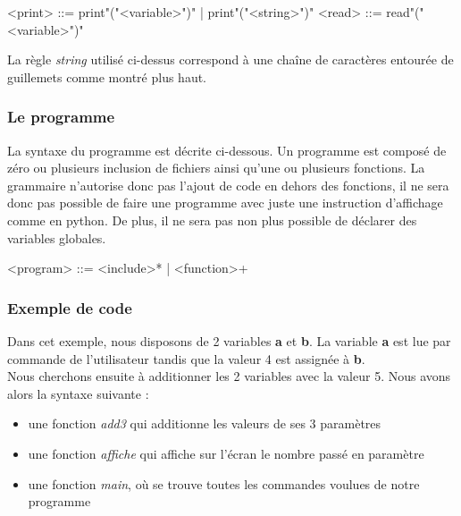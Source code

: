 \documentclass[a4paper]{article}%
\begin{document}
\begin{grammar}
  <print> ::= print"("<variable>")" | print"("<string>")"
  <read> ::= read"("<variable>")"
\end{grammar}\leavevmode\newline

La règle \textit{string} utilisé ci-dessus correspond à une chaîne de caractères
entourée de guillemets comme montré plus haut.

\subsubsection*{Le programme}

La syntaxe du programme est décrite ci-dessous. Un programme est composé de zéro
ou plusieurs inclusion de fichiers ainsi qu'une ou plusieurs fonctions. La
grammaire n'autorise donc pas l'ajout de code en dehors des fonctions, il ne
sera donc pas possible de faire une programme avec juste une instruction
d'affichage comme en python. De plus, il ne sera pas non plus possible de
déclarer des variables globales.

\begin{grammar}
  <program> ::= <include>* | <function>+
\end{grammar}\leavevmode\newline

\subsubsection*{Exemple de code}

Dans cet exemple, nous disposons de 2 variables \textbf{a} et \textbf{b}. La
variable \textbf{a} est lue par commande de l'utilisateur tandis que la valeur 4
est assignée à \textbf{b}.\\
Nous cherchons ensuite à additionner les 2 variables avec la valeur 5. Nous avons alors la syntaxe suivante :\\

\begin{itemize}
  \item une fonction \textit{add3} qui additionne les valeurs de ses 3 paramètres\\
  \item une fonction \textit{affiche} qui affiche sur l'écran le nombre passé en paramètre\\
  \item une fonction \textit{main}, où se trouve toutes les commandes voulues de notre programme\\
\end{itemize}
\end{document}
